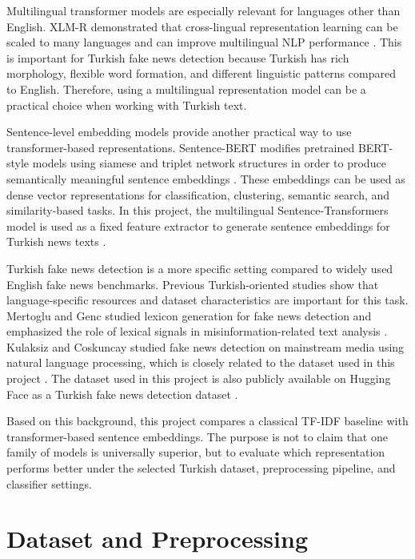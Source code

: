 \documentclass[11pt]{article}
\begin{document}
Multilingual transformer models are especially relevant for languages other than English. XLM-R demonstrated that cross-lingual representation learning can be scaled to many languages and can improve multilingual NLP performance \cite{conneau2020xlmr}. This is important for Turkish fake news detection because Turkish has rich morphology, flexible word formation, and different linguistic patterns compared to English. Therefore, using a multilingual representation model can be a practical choice when working with Turkish text.

Sentence-level embedding models provide another practical way to use transformer-based representations. Sentence-BERT modifies pretrained BERT-style models using siamese and triplet network structures in order to produce semantically meaningful sentence embeddings \cite{reimers2019sentencebert}. These embeddings can be used as dense vector representations for classification, clustering, semantic search, and similarity-based tasks. In this project, the multilingual Sentence-Transformers model  is used as a fixed feature extractor to generate sentence embeddings for Turkish news texts \cite{huggingface_minilm}.

Turkish fake news detection is a more specific setting compared to widely used English fake news benchmarks. Previous Turkish-oriented studies show that language-specific resources and dataset characteristics are important for this task. Mertoglu and Genc studied lexicon generation for fake news detection and emphasized the role of lexical signals in misinformation-related text analysis \cite{mertoglu2020lexicon}. Kulaksiz and Coskuncay studied fake news detection on mainstream media using natural language processing, which is closely related to the dataset used in this project \cite{kulaksiz2025fake}. The dataset used in this project is also publicly available on Hugging Face as a Turkish fake news detection dataset \cite{isakulaksizdataset}.

Based on this background, this project compares a classical TF-IDF baseline with transformer-based sentence embeddings. The purpose is not to claim that one family of models is universally superior, but to evaluate which representation performs better under the selected Turkish dataset, preprocessing pipeline, and classifier settings.

\section{Dataset and Preprocessing}
\end{document}
